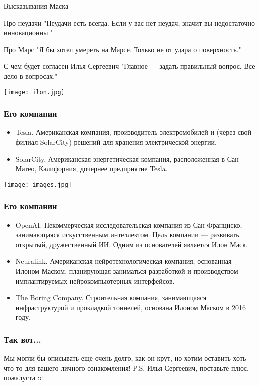 \documentclass{beamer}
\begin{document}
\begin{frame}{Высказывания Маска}
\begin{block}{Про неудачи}
 "Неудачи есть всегда. Если у вас нет неудач, значит вы недостаточно инновационны."
\end{block}
\begin{block}{Про Марс}
 "Я бы хотел умереть на Марсе. Только не от удара о поверхность."
\end{block}
\begin{block}{С чем будет согласен Илья Сергеевич}
 "Главное — задать правильный вопрос. Все дело в вопросах."
\end{block}
\centering\texttt{[image: ilon.jpg]}\par
\end{frame}
\begin{frame}
\frametitle{Его компании}
\begin{itemize}
	\item Tesla. Американская компания, производитель электромобилей и (через свой филиал SolarCity) решений для хранения электрической энергии.
	\item SolarCity. Американская энергетическая компания, расположенная в Сан-Матео, Калифорния, дочернее предприятие Tesla. 
\end{itemize}
\centering\texttt{[image: images.jpg]}\par
\end{frame}

\begin{frame}
\frametitle{Его компании}
\begin{itemize}
	\item OpenAI. Некоммерческая исследовательская компания из Сан-Франциско, занимающаяся искусственным интеллектом. 
	Цель компании — развивать открытый, дружественный ИИ. Одним из основателей является Илон Маск. 
	\item Neuralink. Американская нейротехнологическая компания, основанная Илоном Маском, 
	планирующая заниматься разработкой и производством имплантируемых нейрокомпьютерных интерфейсов. 
	\item The Boring Company. Строительная компания, занимающаяся инфраструктурой и прокладкой тоннелей, основана Илоном Маском в 2016 году. 
\end{itemize}
\end{frame}
\begin{frame}
\frametitle{Так вот...}
\centering Мы могли бы описывать еще очень долго, как он крут, но хотим оставить хоть что-то
для вашего личного ознакомления!
\bigskip
 P.S. Илья Сергеевич, поставьте плюс, пожалуста :с
\end{frame}
\end{document}
